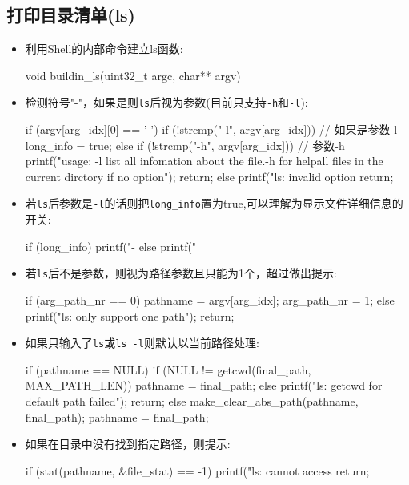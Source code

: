 \subsection{打印目录清单(ls)}
\begin{itemize}
\item 利用Shell的内部命令建立ls函数:
\begin{ccode}
      void buildin_ls(uint32_t argc, char** argv)
\end{ccode}
\item 检测符号"-"，如果是则\texttt{ls}后视为参数(目前只支持\texttt{-h}和\texttt{-l}):
\begin{ccode}
      if (argv[arg_idx][0] == '-')
      {	
	 if (!strcmp("-l", argv[arg_idx])) {         // 如果是参数-l
	    long_info = true;
	 } else if (!strcmp("-h", argv[arg_idx])) {   // 参数-h
	    printf("usage: -l list all infomation about the file.\n-h for help\nlist all files in the current dirctory if no option\n"); 
	    return;
	 } else {	
	    printf("ls: invalid option %
	    return;
	 }
      }
\end{ccode}
\item 若\texttt{ls}后参数是\texttt{-l}的话则把\texttt{long\_info}置为true,可以理解为显示文件详细信息的开关:
\begin{ccode}
      if (long_info)
      {
	 printf("-  %
      } else {
	 printf("%
      }
\end{ccode}
\item 若\texttt{ls}后不是参数，则视为路径参数且只能为1个，超过做出提示:
\begin{ccode}
	 if (arg_path_nr == 0) {
	    pathname = argv[arg_idx];
	    arg_path_nr = 1;
	 } else {
	    printf("ls: only support one path\n");
	    return;
	 }
\end{ccode}
\item 如果只输入了\texttt{ls}或\texttt{ls -l}则默认以当前路径处理:
\begin{ccode}
   if (pathname == NULL)
   {	
      if (NULL != getcwd(final_path, MAX_PATH_LEN)) {
	 pathname = final_path;
      } else {
	 printf("ls: getcwd for default path failed\n");
	 return;
      }
   } else {
      make_clear_abs_path(pathname, final_path);
      pathname = final_path;
   }
\end{ccode}
\item 如果在目录中没有找到指定路径，则提示:
\begin{ccode}
   if (stat(pathname, &file_stat) == -1)
   {
      printf("ls: cannot access %
      return;
   }
\end{ccode}
\end{itemize}

